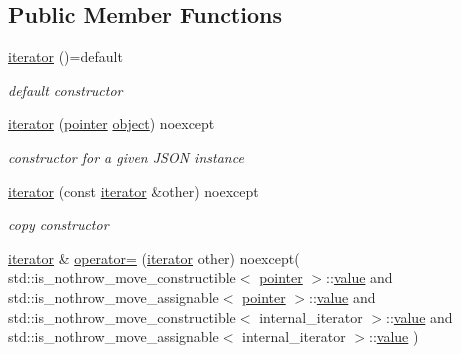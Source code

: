 \subsection*{Public Member Functions}
\begin{DoxyCompactItemize}
\item 
\hyperlink{a00079_a47fb2dbbbfaf65c0ccfa99aeaed920a1}{iterator} ()=default\hypertarget{a00079_a47fb2dbbbfaf65c0ccfa99aeaed920a1}{}\label{a00079_a47fb2dbbbfaf65c0ccfa99aeaed920a1}

\begin{DoxyCompactList}\small\item\em default constructor \end{DoxyCompactList}\item 
\hyperlink{a00079_a085fe0d8cf459b5b1ae7b518b933ae7d}{iterator} (\hyperlink{a00038_a1da96fc3054d547e7706d3a2f073f389}{pointer} \hyperlink{a00025_ad25b2f8c21e241e2d63455537a9294ff}{object}) noexcept\hypertarget{a00079_a085fe0d8cf459b5b1ae7b518b933ae7d}{}\label{a00079_a085fe0d8cf459b5b1ae7b518b933ae7d}

\begin{DoxyCompactList}\small\item\em constructor for a given J\+S\+ON instance \end{DoxyCompactList}\item 
\hyperlink{a00079_a1de0975e812c83e74d118b3e1063f335}{iterator} (const \hyperlink{a00079}{iterator} \&other) noexcept\hypertarget{a00079_a1de0975e812c83e74d118b3e1063f335}{}\label{a00079_a1de0975e812c83e74d118b3e1063f335}

\begin{DoxyCompactList}\small\item\em copy constructor \end{DoxyCompactList}\item 
\hyperlink{a00079}{iterator} \& \hyperlink{a00079_a3db892729714c4e7eaf60c00ee96e2e9}{operator=} (\hyperlink{a00079}{iterator} other) noexcept(                                       std\+::is\+\_\+nothrow\+\_\+move\+\_\+constructible$<$ \hyperlink{a00038_a1da96fc3054d547e7706d3a2f073f389}{pointer} $>$\+::\hyperlink{a00079_a8ffbf287736048e683f58306fdb8701f}{value} and                                       std\+::is\+\_\+nothrow\+\_\+move\+\_\+assignable$<$ \hyperlink{a00038_a1da96fc3054d547e7706d3a2f073f389}{pointer} $>$\+::\hyperlink{a00079_a8ffbf287736048e683f58306fdb8701f}{value} and                                       std\+::is\+\_\+nothrow\+\_\+move\+\_\+constructible$<$ internal\+\_\+iterator $>$\+::\hyperlink{a00079_a8ffbf287736048e683f58306fdb8701f}{value} and                                       std\+::is\+\_\+nothrow\+\_\+move\+\_\+assignable$<$ internal\+\_\+iterator $>$\+::\hyperlink{a00079_a8ffbf287736048e683f58306fdb8701f}{value}                       )\hypertarget{a00079_a3db892729714c4e7eaf60c00ee96e2e9}{}\label{a00079_a3db892729714c4e7eaf60c00ee96e2e9}


\end{DoxyCompactItemize}
